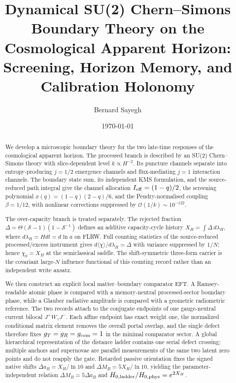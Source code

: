 \documentclass[aps,prd,twocolumn,10pt,superscriptaddress,nofootinbib]{revtex4-2}
\begin{document}
\title{Dynamical SU(2) Chern--Simons Boundary Theory on the Cosmological Apparent Horizon:\\ Screening, Horizon Memory, and Calibration Holonomy}

\author{Bernard Sayegh}

\date{\today}

\begin{abstract}
We develop a microscopic boundary theory for the two late-time responses of
the cosmological apparent horizon.  The processed branch is described by an
SU(2) Chern--Simons theory with slice-dependent level $k\propto H^{-2}$.
Its puncture channels separate into entropy-producing $j=1/2$ emergence
channels and flux-mediating $j=1$ interaction channels.  The boundary state
sum, its independent KMS formulation, and the source-reduced path integral
give the channel allocation $I_{\rm eff}=(1-q)/2$, the screening polynomial
$x(q)=(1-q)(2-q)/6$, and the Pendry-normalised coupling $\beta=1/12$, with
nonlinear corrections suppressed by $\mathcal O(1/k)\sim10^{-122}$.

The over-capacity branch is treated separately.  The rejected fraction
$\Delta=\Theta(\mathcal S-1)(1-\mathcal S^{-1})$ defines an additive
capacity-cycle history $X_H=\int\Delta\,d\lambda_H$, where
$d\lambda_H=Hdt=d\ln a$ on FLRW.  Full counting statistics of the
source-reduced processed/excess instrument gives
$d\langle\chi\rangle/d\lambda_H=\Delta$ with variance suppressed by $1/N$;
hence $\chi_0=X_H$ at the semiclassical saddle.  The shift-symmetric
three-form carrier is the covariant large-$N$ influence functional of this
counting record rather than an independent write ansatz.

We then construct an explicit local matter--boundary comparator EFT.  A
Ramsey-readable atomic phase is compared with a memory-neutral
processed-sector boundary phase, while a Glauber radiative amplitude is
compared with a geometric radiometric reference.  The two records attach to
the conjugate endpoints of one gauge-neutral current bilocal
$J^+W_\gamma J^-$.  Each affine endpoint has exact weight one, the normalized
conditional matrix element removes the overall portal overlap, and the
single defect therefore fixes $g_T=g_R=g_{\rm com}=1$ in the minimal
comparator sector.  A global hierarchical representation of the distance
ladder contains one serial defect crossing; multiple anchors and
supernovae are parallel measurements of the same two latent zero points and
do not reapply the gate.  Retarded passive orientation fixes the signed
native shifts
$\Delta a_B=X_H/\ln10$ and
$\Delta M_B=5X_H/\ln10$, yielding the parameter-independent relation
$\Delta M_B=5\Delta a_B$ and
$H_{0,\rm ladder}/H_{0,\rm phys}=e^{2X_H}$.


\end{abstract}
\end{document}
